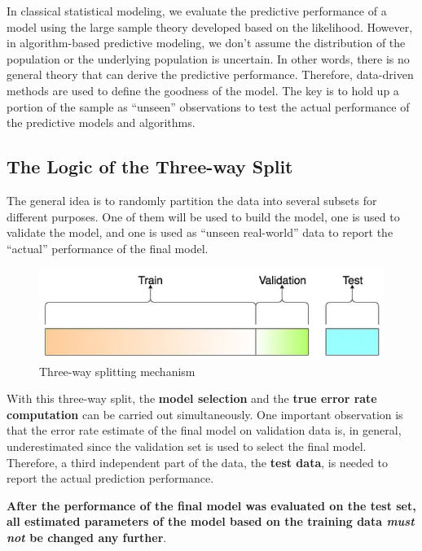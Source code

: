 \documentclass[
]{book}
\begin{document}
In classical statistical modeling, we evaluate the predictive performance of a model using the large sample theory developed based on the likelihood. However, in algorithm-based predictive modeling, we don't assume the distribution of the population or the underlying population is uncertain. In other words, there is no general theory that can derive the predictive performance. Therefore, data-driven methods are used to define the goodness of the model. The key is to hold up a portion of the sample as ``unseen'' observations to test the actual performance of the predictive models and algorithms.

\hypertarget{the-logic-of-the-three-way-split}{%
\subsection{The Logic of the Three-way Split}\label{the-logic-of-the-three-way-split}}

The general idea is to randomly partition the data into several subsets for different purposes. One of them will be used to build the model, one is used to validate the model, and one is used as ``unseen real-world'' data to report the ``actual'' performance of the final model.

\begin{figure}

{\centering \includegraphics[width=0.4\linewidth]{img08/w08-three3WaySplit} 

}

\caption{Three-way splitting mechanism}\label{fig:unnamed-chunk-126}
\end{figure}

With this three-way split, the \textbf{model selection} and the \textbf{true error rate computation} can be carried out simultaneously. One important observation is that the error rate estimate of the final model on validation data is, in general, underestimated since the validation set is used to select the final model. Therefore, a third independent part of the data, the \textbf{test data}, is needed to report the actual prediction performance.

\textbf{After the performance of the final model was evaluated on the test set, all estimated parameters of the model based on the training data \emph{must not} be changed any further}.
\end{document}
